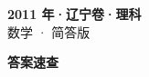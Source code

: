 \documentclass[zihao=-4, a4paper]{ctexart}
\begin{document}
\begin{center}
  {\Large\bfseries 2011 年·辽宁卷·理科}\\[4pt]
  {\large 数学 · 简答版}
\end{center}
\medskip
{}

\clearpage
{}
\begin{center}{\Large\bfseries 答案速查}\end{center}
\medskip

\end{document}
